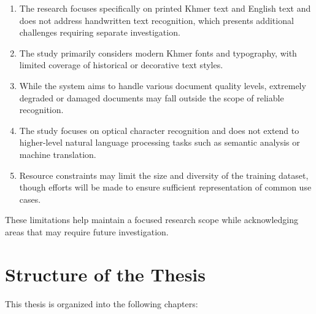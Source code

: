 \begin{enumerate}
    \item The research focuses specifically on printed Khmer text and English text and does not address handwritten text recognition, which presents additional challenges requiring separate investigation.
    
    \item The study primarily considers modern Khmer fonts and typography, with limited coverage of historical or decorative text styles.
    
    \item While the system aims to handle various document quality levels, extremely degraded or damaged documents may fall outside the scope of reliable recognition.
    
    \item The study focuses on optical character recognition and does not extend to higher-level natural language processing tasks such as semantic analysis or machine translation.
    
    \item Resource constraints may limit the size and diversity of the training dataset, though efforts will be made to ensure sufficient representation of common use cases.
\end{enumerate}

These limitations help maintain a focused research scope while acknowledging areas that may require future investigation.

\section{Structure of the Thesis}
\label{sec:structure}

This thesis is organized into the following chapters:

